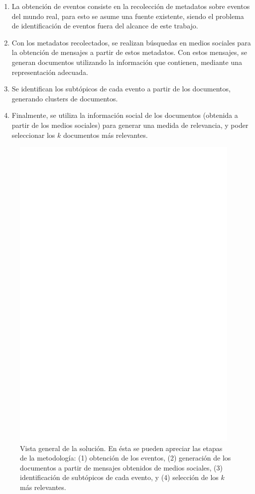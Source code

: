 \documentclass[upright, contnum]{umemoria}
\begin{document}
\begin{enumerate}
\item La obtención de eventos consiste en la recolección de metadatos
     sobre eventos del mundo real, para esto se asume una fuente
     existente, siendo el problema de identificación de eventos fuera
     del alcance de este trabajo.
\item Con los metadatos recolectados, se realizan búsquedas en medios
     sociales para la obtención de mensajes a partir de estos
     metadatos. Con estos mensajes, se generan documentos utilizando la
     información que contienen, mediante una representación adecuada.
\item Se identifican los subtópicos de cada evento a partir de los
     documentos, generando clusters de documentos.
\item Finalmente, se utiliza la información social de los documentos
     (obtenida a partir de los medios sociales) para generar una medida
     de relevancia, y poder seleccionar los $k$ documentos más
     relevantes.
\end{enumerate}
  \begin{figure}[h!b]  
  \centering
  \includegraphics[width=11cm]{./dia/model2.ps}
  \caption[Vista general de la solución.]
   {Vista general de la solución\label{fig:overview}. En ésta se
  pueden apreciar las etapas de la metodología: (1) obtención de los
  eventos, (2) generación de los documentos a partir de mensajes
  obtenidos de medios sociales, (3) identificación de subtópicos de
  cada evento, y (4) selección de los $k$ más relevantes.}
  \end{figure}
\end{document}
